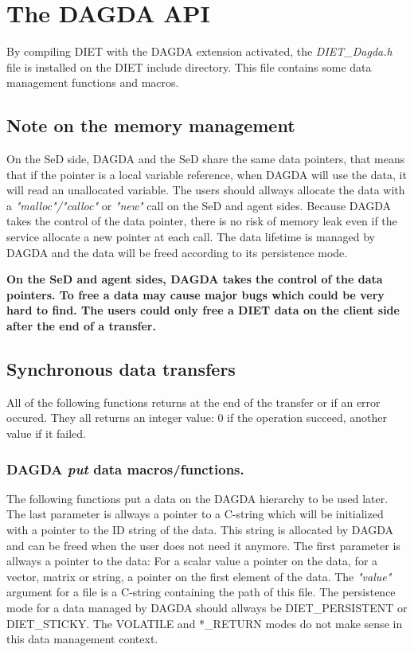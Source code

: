 \section{The DAGDA API}
By compiling DIET with the DAGDA extension activated, the
\textit{DIET\_Dagda.h} file is installed on the DIET include directory.
This file contains some data management functions and macros.
\subsection{Note on the memory management}
On the SeD side, DAGDA and the SeD share the
same data pointers, that means that if the pointer is a local variable
reference, when DAGDA will use the data, it will read an unallocated variable.
The users should allways allocate the data with a \textit{"malloc"/"calloc"} or
\textit{"new"} call on the SeD and agent sides. Because DAGDA takes the control
of the data pointer, there is no risk of memory leak even if the service
allocate a new pointer at each call. The data lifetime is managed by DAGDA
and the data will be freed according to its persistence mode.\\[4mm]
\begin{minipage}{2cm}
  \centering
  \textbf{{\Huge \Biohazard}}
\end{minipage}
\begin{minipage}{\textwidth - 2cm}
\textbf{On the SeD and agent sides, DAGDA takes the control of the data
pointers. To free a data may cause major bugs which could be very hard to
find. The users could only free a DIET data on the client side after the end of
a transfer.}
\end{minipage}
\subsection{Synchronous data transfers}
All of the following functions returns at the end of the transfer or
if an error occured. They all returns an integer value: 0 if the operation
succeed, another value if it failed.
\subsubsection{DAGDA \textit{put} data macros/functions.}
\label{sec:syncPutFunctions}
The following functions put a data on the DAGDA hierarchy to be used later.
The last parameter is allways a pointer to a C-string which will be
initialized with a pointer to the ID string of the data. This string is
allocated by DAGDA and can be freed when the user does not need it anymore.
The first parameter is allways a pointer to the data: For a scalar value
a pointer on the data, for a vector, matrix or string, a pointer on the
first element of the data. The \textit{"value"} argument for a file is
a C-string containing the path of this file. The persistence mode for
a data managed by DAGDA should allways be DIET\_PERSISTENT or DIET\_STICKY.
The VOLATILE and *\_RETURN modes do not make sense in this data management
context.

